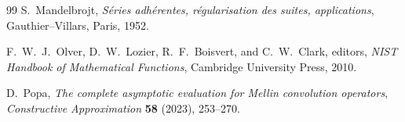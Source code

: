 \documentclass[11pt,oneside]{article}
\theoremstyle{definition}
\theoremstyle{remark}
\begin{document}
\begin{thebibliography}{99}
S.~Mandelbrojt,
\emph{S\'eries adh\'erentes, r\'egularisation des suites, applications},
Gauthier--Villars, Paris, 1952.

F.~W.~J.~Olver, D.~W.~Lozier, R.~F.~Boisvert, and C.~W.~Clark, editors,
\emph{NIST Handbook of Mathematical Functions},
Cambridge University Press, 2010.

D.~Popa,
\emph{The complete asymptotic evaluation for Mellin convolution operators},
\emph{Constructive Approximation} \textbf{58} (2023), 253--270.

\end{thebibliography}
\end{document}
